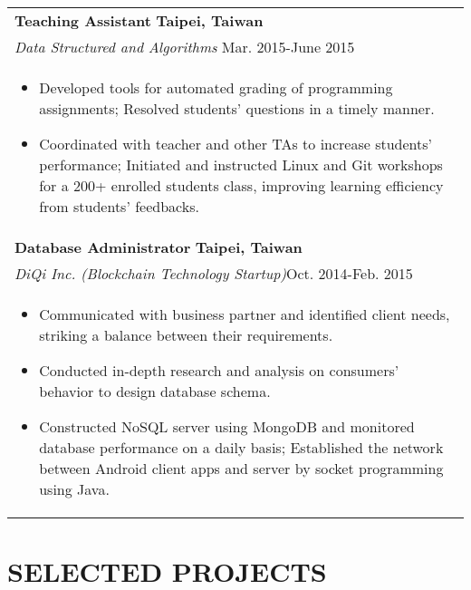 \documentclass[a4paper,10pt]{article} %
\begin{document}
{\begin{tabular}{p{18.5cm}}
{\fontsize{11}{13.2}\textbf{Teaching Assistant}} \hfill \textbf{Taipei, Taiwan}\\
{\it Data Structured and Algorithms} \hfill  Mar. 2015-June 2015 \\%
\begin{itemize}
\vspace{-2mm}
\item Developed tools for automated grading of programming assignments; Resolved students' questions in a timely manner.
\item Coordinated with teacher and other TAs to increase students' performance; Initiated and instructed Linux and Git workshops for a 200+ enrolled students class, improving learning efficiency from students' feedbacks.\vspace*{-\baselineskip}
\end{itemize} \\ 
\vspace{0.5mm}

{\fontsize{11}{13.2}\textbf{Database Administrator}} \hfill \textbf{Taipei, Taiwan}\\ 
{\it DiQi Inc. (Blockchain Technology Startup)}\hfill  Oct. 2014-Feb. 2015  \\%
\begin{itemize}
\vspace{-2mm}
\item Communicated with business partner and identified client needs, striking a balance between their requirements. 
\item Conducted in-depth research and analysis on consumers' behavior to design database schema.
\item Constructed NoSQL server using MongoDB and monitored database performance on a daily basis; Established the network between Android client apps and server by socket programming using Java. \vspace*{-\baselineskip}
\end{itemize}\\
\end{tabular}


\section{\textbf{SELECTED PROJECTS}}
\begin{tabular}{p{18.5cm}}


\end{tabular}}
\end{document}

